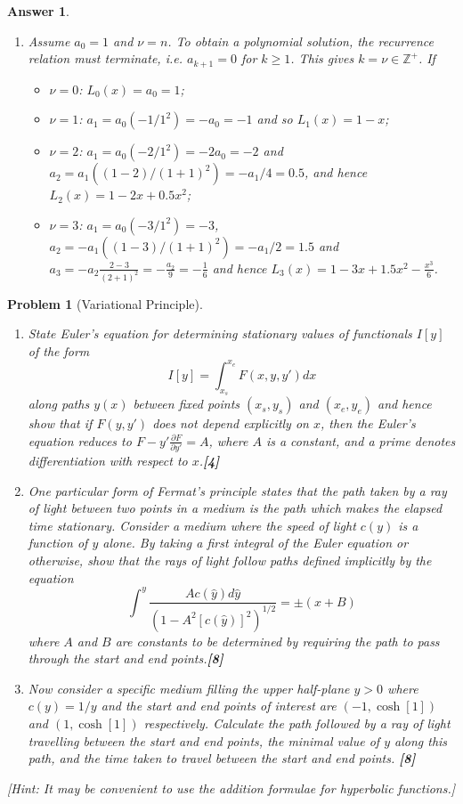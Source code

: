 \documentclass[a4paper]{article}
\newtheorem{ans}{Answer}[section]
\theoremstyle{new}
\newtheorem{qns}{Problem}[section]
\begin{document}
\begin{ans}
\begin{enumerate}[label=(\alph*)]
\item Assume $a_0=1$ and $\nu=n$. To obtain a polynomial solution, the recurrence relation must terminate, i.e. $a_{k+1}=0$ for $k\geq1$. This gives $k=\nu\in\mathbb{Z}^+$. If
\begin{itemize}
    \item $\nu=0$: $L_0(x)=a_0=1$;
    \item $\nu=1$: $a_1=a_0(-1/1^2)=-a_0=-1$ and so $L_1(x)=1-x$;
    \item $\nu=2$: $a_1=a_0(-2/1^2)=-2a_0=-2$ and $a_2=a_1((1-2)/(1+1)^2)=-a_1/4=0.5$, and hence $L_2(x)=1-2x+0.5x^2$;
    \item $\nu=3$: $a_1=a_0(-3/1^2)=-3$, $a_2=-a_1((1-3)/(1+1)^2)=-a_1/2=1.5$ and $a_3=-a_2\frac{2-3}{(2+1)^2}=-\frac{a_2}{9}=-\frac{1}{6}$ and hence $L_3(x)=1-3x+1.5x^2-\frac{x^3}{6}$.
\end{itemize}
\end{enumerate}
\end{ans}
\begin{qns}[Variational Principle]\leavevmode
\begin{enumerate}[label=(\alph*)]
\item  State Euler's equation for determining stationary values of functionals $I[y]$ of the form
$$I[y]=\int_{x_s}^{x_e}F(x,y,y')dx$$
along paths $y(x)$ between fixed points $(x_s,y_s)$ and $(x_e,y_e)$ and hence show that if $F(y,y')$ does not depend explicitly on $x$, then the Euler's equation reduces to $F-y'\frac{\partial F}{\partial y'}=A$, where $A$ is a constant, and a prime denotes differentiation with respect to $x$.\hfill \textbf{[4]}
\item One particular form of Fermat’s principle states that the path taken by a ray of light between two points in a medium is the path which makes the elapsed time stationary. Consider a medium where the speed of light $c(y)$ is a function of $y$ alone. By taking a first integral of the Euler equation or otherwise, show that the rays of light follow paths defined implicitly by the equation
$$\int^y\frac{Ac(\hat{y})d\hat{y}}{(1-A^2[c(\hat{y})]^2)^{1/2}}=\pm(x+B)$$
where $A$ and $B$ are constants to be determined by requiring the path to pass through the start and end points.\hfill \textbf{[8]}
\item Now consider a specific medium filling the upper half-plane $y > 0$ where $c(y) = 1/y$ and the start and end points of interest are $(−1, \cosh[1])$ and $(1, \cosh[1])$ respectively. Calculate the path followed by a ray of light travelling between the start and end points, the minimal value of $y$ along this path, and the time taken to travel between the start and end points. \hfill \textbf{[8]}
\end{enumerate}
[Hint: It may be convenient to use the addition formulae for hyperbolic functions.]
\end{qns}
\end{document}
